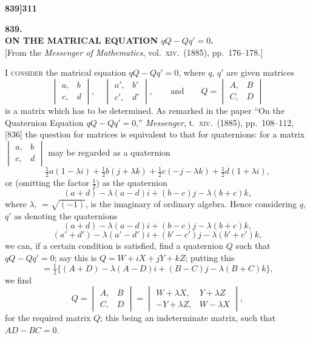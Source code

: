 \documentclass[11pt]{article}
\begin{document}
\bigskip
\bigskip


\newpage

\noindent\textbf{839]}\hfill\textbf{311}

\bigskip

\begin{center}
{\large\textbf{839.}}\\[0.7em]
{\large\textbf{ON THE MATRICAL EQUATION $qQ - Qq' = 0$.}}\\[1em]
{\small [From the \textit{Messenger of Mathematics}, vol.\ \textsc{xiv}.\ (1885), pp.\ 176--178.]}
\end{center}

\bigskip

\noindent I \textsc{consider} the matrical equation $qQ - Qq' = 0$, where $q$, $q'$ are given matrices
\[
\begin{vmatrix} a, & b \\ c, & d \end{vmatrix},\quad \begin{vmatrix} a', & b' \\ c', & d' \end{vmatrix}, \qquad\text{and}\qquad Q = \begin{vmatrix} A, & B \\ C, & D \end{vmatrix}
\]
is a matrix which has to be determined. As remarked in the paper ``On the Quaternion Equation $qQ - Qq' = 0$,'' \textit{Messenger}, t.\ \textsc{xiv}.\ (1885), pp.\ 108--112, [836] the question for matrices is equivalent to that for quaternions: for a matrix $\begin{vmatrix} a, & b \\ c, & d \end{vmatrix}$ may be regarded as a quaternion
\[
\tfrac{1}{2}a(1 - \lambda i) + \tfrac{1}{2}b(j + \lambda k) + \tfrac{1}{2}c(-j - \lambda k) + \tfrac{1}{2}d(1 + \lambda i),
\]
or (omitting the factor $\tfrac{1}{2}$) as the quaternion
\[
(a + d) - \lambda(a - d)i + (b - c)j - \lambda(b + c)k,
\]
where $\lambda$, $= \sqrt{(-1)}$, is the imaginary of ordinary algebra. Hence considering $q$, $q'$ as denoting the quaternions
\[
(a + d) - \lambda(a - d)i + (b - c)j - \lambda(b + c)k,
\]
\[
(a' + d') - \lambda(a' - d')i + (b' - c')j - \lambda(b' + c')k,
\]
we can, if a certain condition is satisfied, find a quaternion $Q$ such that $qQ - Qq' = 0$; say this is $Q = W + iX + jY + kZ$; putting this
\[
= \tfrac{1}{2}\{(A + D) - \lambda(A - D)i + (B - C)j - \lambda(B + C)k\},
\]
we find
\[
Q = \begin{vmatrix} A, & B \\ C, & D \end{vmatrix} = \begin{vmatrix} W + \lambda X, & Y + \lambda Z \\ -Y + \lambda Z, & W - \lambda X \end{vmatrix},
\]
for the required matrix $Q$; this being an indeterminate matrix, such that $AD - BC = 0$.
\end{document}
